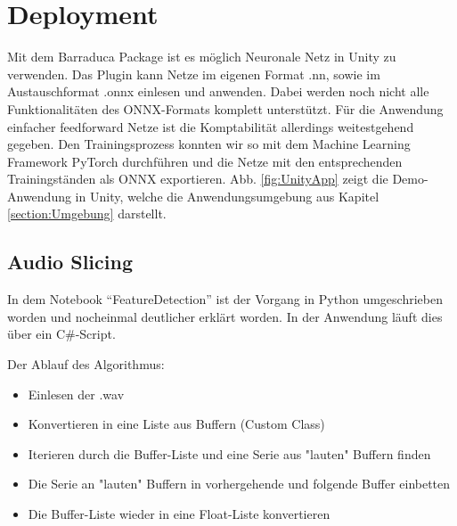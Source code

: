 \documentclass[sigconf]{acmart}
\begin{document}
\section{Deployment}
Mit dem Barraduca Package ist es möglich Neuronale Netz in Unity zu verwenden. Das Plugin kann Netze im eigenen Format .nn, sowie im Austauschformat .onnx einlesen und anwenden. Dabei werden noch nicht alle Funktionalitäten des ONNX-Formats komplett unterstützt. Für die Anwendung einfacher feedforward Netze ist die Komptabilität allerdings weitestgehend gegeben. Den Trainingsprozess konnten wir so mit dem Machine Learning Framework PyTorch durchführen und die Netze mit den entsprechenden Trainingständen als ONNX exportieren. Abb. \ref{fig:UnityApp} zeigt die Demo-Anwendung in Unity, welche die Anwendungsumgebung aus Kapitel \ref{section:Umgebung} darstellt. 

\subsection{Audio Slicing}
In dem Notebook “FeatureDetection” ist der Vorgang in Python umgeschrieben worden und nocheinmal deutlicher erklärt worden. In der Anwendung läuft dies über ein C\#-Script. 

Der Ablauf des Algorithmus: 
\begin{itemize}
\item Einlesen der .wav
\item Konvertieren in eine Liste aus Buffern (Custom Class)
\item Iterieren durch die Buffer-Liste und eine Serie aus "lauten" Buffern finden
\item Die Serie an "lauten" Buffern in vorhergehende und folgende Buffer einbetten
\item Die Buffer-Liste wieder in eine Float-Liste konvertieren
\end{itemize}
\end{document}
